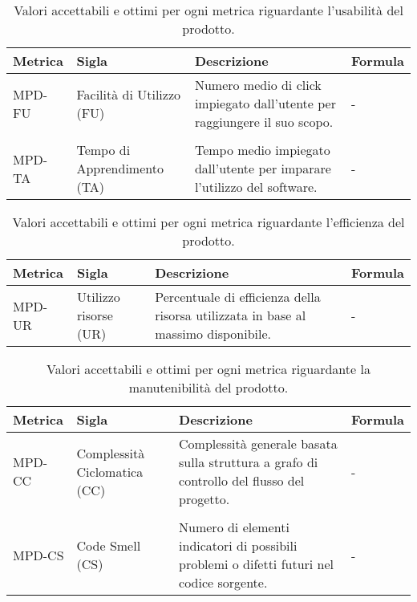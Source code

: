 \begin{table}[H]	
	\centering
	\begin{tabular}{p{2cm} p{3cm} p{6cm} p{4cm}}
		\toprule
		\textbf{Metrica}& \textbf{Sigla} & \textbf{Descrizione} & \textbf{Formula} \\
		\midrule
		MPD-FU & Facilità di Utilizzo (FU) & Numero medio di click impiegato dall'utente per raggiungere il suo scopo. & - \\\\
		MPD-TA & Tempo di Apprendimento (TA) & Tempo medio impiegato dall'utente per imparare l'utilizzo del software. & - \\
		\bottomrule
	\end{tabular}
	\caption{Valori accettabili e ottimi per ogni metrica riguardante l’usabilità del prodotto.}
	\label{table:Valori accettabili e ottimi per ogni metrica riguardante l’usabilità del prodotto.}
\end{table}

\begin{table}[H]	
	\centering
	\begin{tabular}{p{2cm} p{3cm} p{6cm} p{4cm}}
		\toprule
		\textbf{Metrica}& \textbf{Sigla} & \textbf{Descrizione} & \textbf{Formula} \\
		\midrule
		MPD-UR & Utilizzo risorse (UR) & Percentuale di efficienza della risorsa utilizzata in base al massimo disponibile. & - \\
		\bottomrule
	\end{tabular}
	\caption{Valori accettabili e ottimi per ogni metrica riguardante l’efficienza del prodotto.}
	\label{table:Valori accettabili e ottimi per ogni metrica riguardante l’efficienza del prodotto.}
\end{table}
\clearpage
{}
\begin{table}[H]	
	\centering
	\begin{tabular}{p{2cm} p{3cm} p{6cm} p{4cm}}
		\toprule
		\textbf{Metrica}& \textbf{Sigla} & \textbf{Descrizione} & \textbf{Formula} \\
		\midrule
		MPD-CC & Complessità Ciclomatica (CC) & Complessità generale basata sulla struttura a grafo di controllo del flusso del progetto.& - \\\\
		MPD-CS & Code Smell (CS) & Numero di elementi indicatori di possibili problemi o difetti futuri nel codice sorgente. & - \\
		\bottomrule
	\end{tabular}
	\caption{Valori accettabili e ottimi per ogni metrica riguardante la manutenibilità del prodotto.}
	\label{table:Valori accettabili e ottimi per ogni metrica riguardante la manutenibilità del prodotto.}
\end{table}

